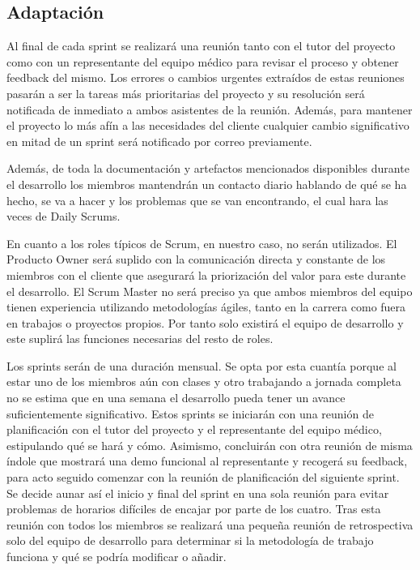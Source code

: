      \subsection{Adaptación}
    Al final de cada sprint se realizará una reunión tanto con el tutor del proyecto como con un representante del equipo médico para revisar el proceso y obtener feedback del mismo. Los errores o cambios urgentes extraídos de estas reuniones pasarán a ser la tareas más prioritarias del proyecto y su resolución será notificada de inmediato a ambos asistentes de la reunión. Además, para mantener el proyecto lo más afín a las necesidades del cliente cualquier cambio significativo en mitad de un sprint será notificado por correo previamente.
    \newline
    
    Además, de toda la documentación y artefactos mencionados disponibles durante el desarrollo los miembros mantendrán un contacto diario hablando de qué se ha hecho, se va a hacer y los problemas que se van encontrando, el cual hara las veces de Daily Scrums.\newline

	En cuanto a los roles típicos de Scrum, en nuestro caso, no serán utilizados. El Producto Owner será suplido con la comunicación directa y constante  de los miembros con el cliente que asegurará la priorización del valor para este durante el desarrollo. El Scrum Master no será preciso ya que ambos miembros del equipo tienen experiencia utilizando metodologías ágiles, tanto en la carrera como fuera en trabajos o proyectos propios. Por tanto solo existirá el equipo de desarrollo y este suplirá las funciones necesarias del resto de roles.\newline

	Los sprints serán de una duración mensual. Se opta por esta cuantía porque al estar uno de los miembros aún con clases y otro trabajando a jornada completa no se estima que en una semana el desarrollo pueda tener un avance suficientemente significativo. Estos sprints se iniciarán con una reunión de planificación con el tutor del proyecto y el representante del equipo médico, estipulando qué se hará y cómo. Asimismo, concluirán con otra reunión de misma índole que mostrará una demo funcional al representante y recogerá su feedback, para acto seguido comenzar con la reunión de planificación del siguiente sprint. Se decide aunar así el inicio y final del sprint en una sola reunión para evitar problemas de horarios difíciles de encajar por parte de los cuatro. Tras esta reunión con todos los miembros se realizará una pequeña reunión de retrospectiva solo del equipo de desarrollo para determinar si la metodología de trabajo funciona y qué se podría modificar o añadir.\newline

